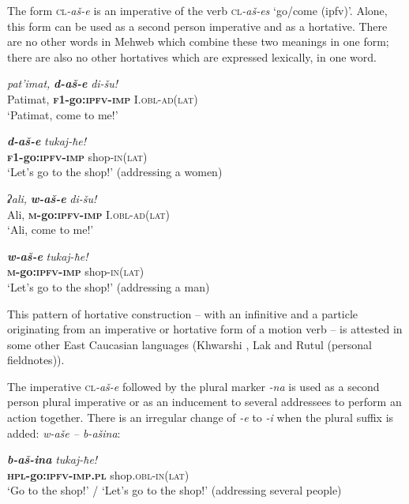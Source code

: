 ﻿\documentclass[output=paper]{langsci/langscibook}
\begin{document}
The form \textsc{cl}\emph{-aš-e} is an imperative of the verb \textsc{cl}\emph{-aš-es} `go/come (ipfv)'.
Alone, this form can be used as a second person
imperative and as a hortative. There are no other words in Mehweb which
combine these two meanings in one form; there are also no other
hortatives which are expressed lexically, in one word.

\ea %
\gll \emph{pat'imat,} \emph{\textbf{d-aš-e}}  \emph{di-šu!}\\
 Patimat, \textbf{\textsc{f1}-go:\textsc{ipfv}-\textsc{imp}} I.\textsc{obl}-\textsc{ad}(\textsc{lat})\\
\glt `Patimat, come to me!'

\ex %
\gll \emph{\textbf{d-aš-e}} \emph{tukaj-ħe!}\\
 \textbf{\textsc{f1}-go:\textsc{ipfv}-\textsc{imp}} shop-\textsc{in}(\textsc{lat})\\
\glt `Let's go to the shop!' (addressing a women)

\ex %
\gll \emph{ʡali,} \emph{\textbf{w-aš-e}}  \emph{di-šu!}\\
 Ali, \textbf{\textsc{m}-go:\textsc{ipfv}-\textsc{imp}} I.\textsc{obl}-\textsc{ad}(\textsc{lat})\\
\glt `Ali, come to me!'

\ex %
\gll \emph{\textbf{w-aš-e}} \emph{tukaj-ħe!}\\
 \textbf{\textsc{m}-go:\textsc{ipfv}-\textsc{imp}} shop-\textsc{in}(\textsc{lat})\\
\glt `Let's go to the shop!' (addressing a man)
\z

This pattern of hortative construction – with an infinitive and a
particle originating from an imperative or hortative form of a motion
verb – is attested in some other East Caucasian languages (Khwarshi
\citep{khalilova2009}, Lak and Rutul (personal fieldnotes)).

The imperative \textsc{cl}\emph{-aš-e} followed by the plural marker \emph{-na}
is used as a second person plural imperative or as an inducement to
several addressees to perform an action together. There is an irregular
change of \emph{-e} to \emph{-i} when the plural suffix is added:
\emph{w-aše – b-ašina}:

\ea %
\gll \emph{\textbf{b-aš-ina}} \emph{tukaj-ħe!}\\
\textbf{\textsc{hpl}-go:\textsc{ipfv}-\textsc{imp}.\textsc{pl}} shop.\textsc{obl}-\textsc{in}(\textsc{lat})\\
\glt `Go to the shop!' / `Let's go to the shop!' (addressing several people)
\z
\end{document}
